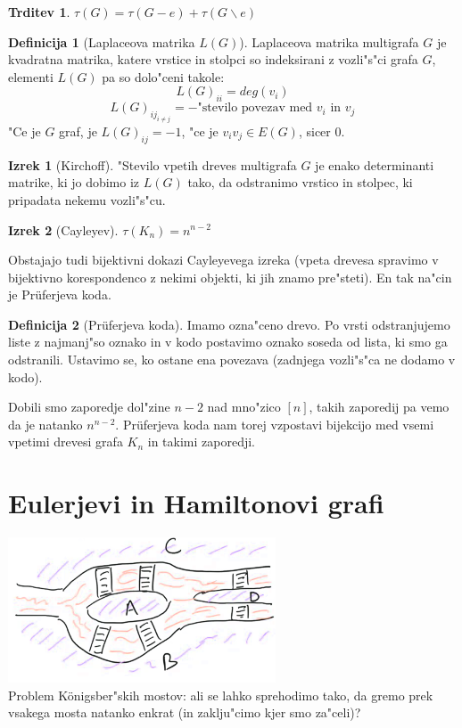\documentclass{article}
\theoremstyle{definition}
\newtheorem{definition}{Definicija}[section]
\newtheorem{claim}{Trditev}[section]
\newtheorem{theorem}{Izrek}[section]
\begin{document}
	\begin{claim}
		$\tau(G) = \tau(G-e) + \tau(G \backslash e)$
	\end{claim}
	
	\begin{definition}[Laplaceova matrika $L(G)$]
		Laplaceova matrika multigrafa $G$ je kvadratna matrika, katere vrstice in stolpci so indeksirani z vozli"s"ci grafa $G$, elementi $L(G)$ pa so dolo"ceni takole:
		$$ L(G)_{ii} = deg(v_i)$$
		$$ L(G)_{ij_{i \neq j}} = -\text{"stevilo povezav med }v_i\text{ in }v_j $$
		"Ce je $G$ graf, je $L(G)_{ij} = -1$, "ce je $v_iv_j \in E(G)$, sicer 0.
	\end{definition}

	\begin{theorem}[Kirchoff]
		"Stevilo vpetih dreves multigrafa $G$ je enako determinanti matrike, ki jo dobimo iz $L(G)$  tako, da odstranimo vrstico in stolpec, ki pripadata nekemu vozli"s"cu.
	\end{theorem} 

	\begin{theorem}[Cayleyev]
		$\tau(K_n) = n^{n-2}$
	\end{theorem}
	
	Obstajajo tudi bijektivni dokazi Cayleyevega izreka (vpeta drevesa spravimo v bijektivno korespondenco z nekimi objekti, ki jih znamo pre"steti). En tak na"cin je Pr\"uferjeva koda.
	\begin{definition}[Pr\"uferjeva koda]
		Imamo ozna"ceno drevo. Po vrsti odstranjujemo liste z najmanj"so oznako in v kodo postavimo oznako soseda od lista, ki smo ga odstranili. Ustavimo se, ko ostane ena povezava (zadnjega vozli"s"ca ne dodamo v kodo).
	\end{definition}
	Dobili smo zaporedje dol"zine $n-2$ nad mno"zico $[n]$, takih zaporedij pa vemo da je natanko $n^{n-2}$. Pr\"uferjeva koda nam torej vzpostavi bijekcijo med vsemi vpetimi drevesi grafa $K_n$ in takimi zaporedji.
	
	\section{Eulerjevi in Hamiltonovi grafi}
	\includegraphics{reka-pregel} \\
	Problem K\"onigsber"skih mostov: ali se lahko sprehodimo tako, da gremo prek vsakega mosta natanko enkrat (in zaklju"cimo kjer smo za"celi)?
	
\end{document}
